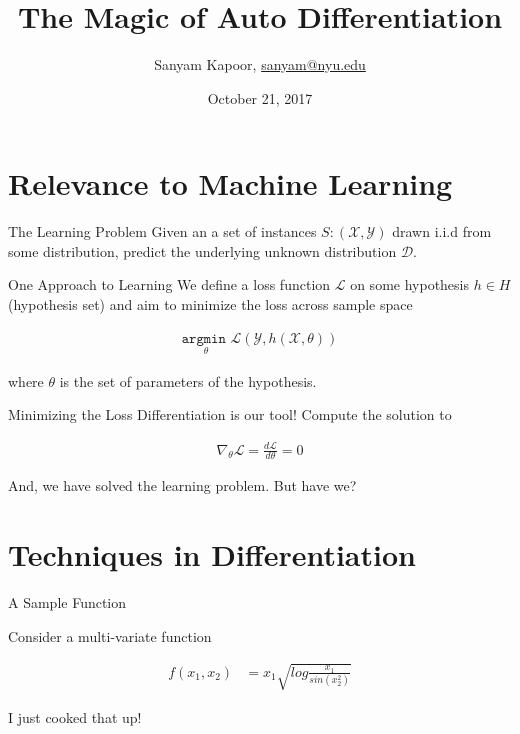 \documentclass{beamer}
\title{The Magic of Auto Differentiation}
\author{Sanyam Kapoor, \href{mailto:sanyam@nyu.edu}{sanyam@nyu.edu}}
\date{October 21, 2017}
\institute{Courant Institute, NYU}
\begin{document}
\maketitle

\section{Relevance to Machine Learning}

\begin{frame}{The Learning Problem}
Given an a set of instances $S: (\mathcal{X}, \mathcal{Y})$ drawn i.i.d from some
distribution, predict the underlying unknown distribution $\mathcal{D}$.
\end{frame}

\begin{frame}{One Approach to Learning}
We define a loss function $\mathcal{L}$ on some hypothesis $h \in H$ (hypothesis set) and
aim to minimize the loss across sample space

\begin{align}
\underset{\theta}{\texttt{argmin }} \mathcal{L}(\mathcal{Y}, h(\mathcal{X}, \theta))
\end{align}

where $\theta$ is the set of parameters of the hypothesis.

\end{frame}

\begin{frame}{Minimizing the Loss}
Differentiation is our tool! Compute the solution to

\begin{align}
\nabla_\theta \mathcal{L} = \frac{d \mathcal{L}}{d \theta} = 0
\end{align}

And, we have solved the learning problem. But have we?

\end{frame}

\section{Techniques in Differentiation}

\begin{frame}{A Sample Function}

Consider a multi-variate function

\begin{align}
f(x_1,x_2) &= x_1\sqrt{log \frac{x_1}{sin(x_2^2)}} \label{eq:sample}
\end{align}

I just cooked that up!

\end{frame}
\end{document}
